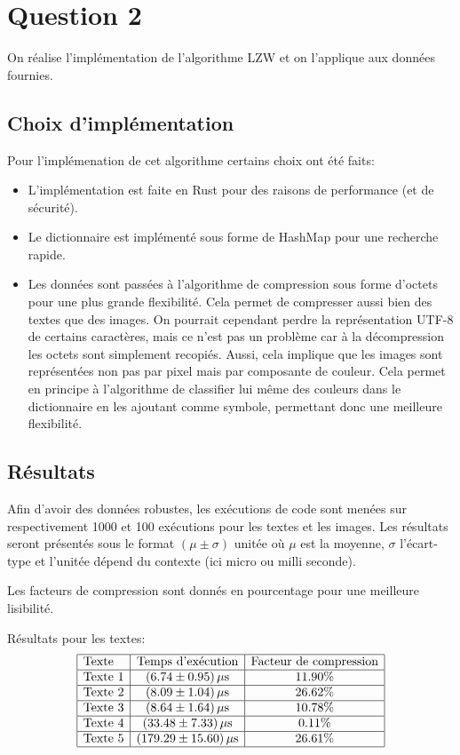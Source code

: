 \documentclass{article}[letterpaper, 11pt]
\begin{document}
\section{Question 2}
On réalise l'implémentation de l'algorithme LZW et on l'applique aux données fournies.

\subsection{Choix d'implémentation}
Pour l'implémenation de cet algorithme certains choix ont été faits:
\begin{itemize}[label={--}]
	\item L'implémentation est faite en Rust pour des raisons de performance (et de sécurité).
	\item Le dictionnaire est implémenté sous forme de HashMap pour une recherche rapide.
	\item Les données sont passées à l'algorithme de compression sous forme d'octets pour une plus grande flexibilité. Cela permet de compresser aussi bien des textes que des images. On pourrait cependant perdre la représentation UTF-8 de certains caractères, mais ce n'est pas un problème car à la décompression les octets sont simplement recopiés. Aussi, cela implique que les images sont représentées non pas par pixel mais par composante de couleur. Cela permet en principe à l'algorithme de classifier lui même des couleurs dans le dictionnaire en les ajoutant comme symbole, permettant donc une meilleure flexibilité.
\end{itemize}

\subsection{Résultats}
Afin d'avoir des données robustes, les exécutions de code sont menées sur respectivement 1000 et 100 exécutions pour les textes et les images.
Les résultats seront présentés sous le format $(\mu \pm \sigma) \text{ unitée}$ où $\mu$ est la moyenne, $\sigma$ l'écart-type et l'unitée dépend du contexte (ici micro ou milli seconde).

Les facteurs de compression sont donnés en pourcentage pour une meilleure lisibilité.

Résultats pour les textes:
\[
\begin{array}{|l|c|c|} \hline %
	\text{Texte} & \text{Temps d'exécution} & \text{Facteur de compression}\\ \hline %
	\text{Texte } 1 & (6.74   \pm  0.95)\, \mu \text{s} & 11.90\%\\ \hline %
	\text{Texte } 2 & (8.09   \pm  1.04)\, \mu \text{s} & 26.62\%\\ \hline %
	\text{Texte } 3 & (8.64   \pm  1.64)\, \mu \text{s} & 10.78\%\\ \hline %
	\text{Texte } 4 & (33.48  \pm  7.33)\, \mu \text{s} & 0.11\%\\ \hline %
	\text{Texte } 5 & (179.29 \pm 15.60)\, \mu \text{s} & 26.61\%\\ \hline %
\end{array}
\]
\end{document}
